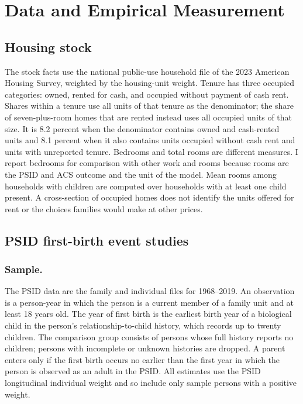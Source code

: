 \appendix
\section{Data and Empirical Measurement}
\label{app:empirical-data}

\subsection{Housing stock}

The stock facts use the national public-use household file of the 2023
American Housing Survey, weighted by the housing-unit weight. Tenure has three
occupied categories: owned, rented for cash, and occupied without payment of
cash rent. Shares within a tenure use all units of that tenure as the
denominator; the share of seven-plus-room homes that are rented instead uses
all occupied units of that size. It is 8.2 percent when the denominator
contains owned and cash-rented units and 8.1 percent when it also contains
units occupied without cash rent and units with unreported tenure. Bedrooms and
total rooms are different measures. I report bedrooms for comparison with
other work and rooms because rooms are the PSID and ACS outcome and the unit of
the model. Mean rooms among households with children are computed over
households with at least one child present. A cross-section of occupied homes
does not identify the units offered for rent or the choices families would
make at other prices.

\subsection{PSID first-birth event studies}

\subsubsection*{Sample.}
The PSID data are the family and individual files for 1968--2019. An
observation is a person-year in which the person is a current member of a
family unit and at least 18 years old. The year of first birth is the earliest
birth year of a biological child in the person's relationship-to-child
history, which records up to twenty children. The comparison group consists of
persons whose full history reports no children; persons with incomplete or
unknown histories are dropped. A parent enters only if the first birth
occurs no earlier than the first year in which the person is observed as an
adult in the PSID. All estimates use the PSID longitudinal individual weight
and so include only sample persons with a positive weight.

